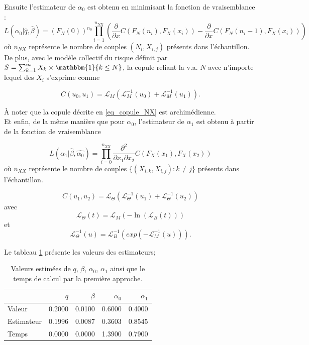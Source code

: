 \documentclass[11pt]{article}
\begin{document}
	Ensuite l'estimateur de $\alpha_{0}$ est obtenu en minimisant la fonction de vraisemblance :
	\[ L(\alpha_{0} \vert \hat{q},\hat{\beta}) = (F_{N}(0))^{n_{0}} \prod^{n_{NX}}_{i=1} \left(\frac{\partial}{\partial x} C(F_{N}(n_i),F_{X}(x_i)) - \frac{\partial}{\partial x} C(F_{N}(n_i-1),F_{X}(x_i))\right) \]
	où $n_{NX}$ représente le nombre de couples $(N_{i},X_{i,j})$ présents dans l'échantillon.\\
	
	De plus, avec le modèle collectif du risque définit par $S= \sum_{k=1}^{\infty} X_k \times \mathbbm{1}\{k \leq N\}$, la copule reliant la v.a. $N$ avec n'importe lequel des $X_i$ s'exprime comme
	
	\begin{equation}\label{eq_copule_NX}
		C(u_{0},u_{1}) = \mathscr{L}_{M}(\mathscr{L}_{M}^{-1}(u_{0}) + \mathscr{L}_{M}^{-1}(u_{1}) ).
	\end{equation}

	À noter que la copule décrite en \eqref{eq_copule_NX} est archimédienne.\\
	
	Et enfin, de la même manière que pour $\alpha_{0}$, l'estimateur de $\alpha_{1}$ est obtenu à partir de la fonction de vraisemblance
	
	\[ L(\alpha_{1} \vert\hat{\beta},\hat{\alpha_{0}}) = \prod^{n_{XX}}_{i=0} \frac{\partial^2}{\partial x_{1}\partial x_{2}} C(F_{X}(x_{1}),F_{X}(x_{2}))  \]
	où $n_{XX}$ représente le nombre de couples $\{(X_{i,k},X_{i,j}): k \neq j\}$ présents dans l'échantillon.
	
	\[ C(u_{1},u_{2}) = \mathscr{L}_{\Theta}(\mathscr{L}_{\Theta}^{-1}(u_{1}) + \mathscr{L}_{\Theta}^{-1}(u_{2}) ) \]
	 avec    \[ \mathscr{L}_{\Theta}(t) = \mathscr{L}_{M}(-\ln(\mathscr{L}_{B}(t))) \]
	 et $$ \mathscr{L}^{-1}_{\Theta}(u) = \mathscr{L}_B^{-1}\left(exp(-\mathscr{L}^{-1}_M(u)) \right). $$
	
	Le tableau \ref{resultats_app1} présente les valeurs des estimateurs;
	
	\begin{table}[H]
		\centering
		\begin{tabular}{lrrrr}
			  \hline
			 & $q$ & $\beta$ & $\alpha_{0}$ & $\alpha_{1}$ \\ 
			  \hline
			  Valeur & 0.2000 & 0.0100 & 0.6000 & 0.4000 \\ 
			  Estimateur & 0.1996 & 0.0087 & 0.3603 & 0.8545 \\ 
			  Temps & 0.0000 & 0.0000 & 1.3900 & 0.7900 \\ 
			   \hline
		\end{tabular}
 		\caption{Valeurs estimées de $q$, $\beta$, $\alpha_{0}$, $\alpha_{1}$ ainsi que le temps de calcul par la première approche.}
	 	\label{resultats_app1}
	\end{table}
\end{document}
